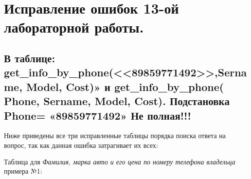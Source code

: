 \documentclass[a4paper,12pt]{article}
\begin{document}
	\section*{Исправление ошибок 13-ой лабораторной работы.}
	
	\subsection*{В таблице:  get\_info\_by\_phone(<<89859771492>>,Sername, Model, Cost)» и
		get\_info\_by\_phone( Phone, Sername, Model, Cost).
		Подстановка Phone= «89859771492»   Не полная!!!
	}
	
	Ниже приведены все три исправленные таблицы порядка поиска ответа на вопрос, так как данная ошибка затрагивает их всех:
	
	\newpage
	
	Таблица для \textit{Фамилия, марка авто и его цена по номеру телефона владельца} примера №1:
	
\end{document}
